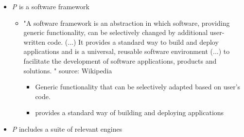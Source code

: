    \begin{itemize}
        \item \emph{P} is a software framework
        \begin{itemize}
          \item {"A software framework is an abstraction in which software, providing generic functionality, can be selectively changed by additional user-written code. 
            (...) 
            It provides a standard way to build and deploy applications and is a universal, reusable software environment 
            (...)
            to facilitate the development of software applications, products and solutions. "} source: Wikipedia

            \begin{itemize}
                \item Generic functionality that can be selectively adapted based on user's code.
                \item provides a standard way of building and deploying applications
            \end{itemize}
        \end{itemize}
        \item \emph{P} includes a suite of relevant engines
    \end{itemize}





